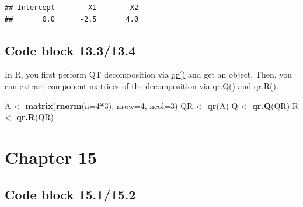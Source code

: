 \documentclass[
]{book}
\newenvironment{Shaded}{\begin{snugshade}}{\end{snugshade}}
\newcommand{\DataTypeTok}[1]{\textcolor[rgb]{0.13,0.29,0.53}{#1}}
\newcommand{\DecValTok}[1]{\textcolor[rgb]{0.00,0.00,0.81}{#1}}
\newcommand{\KeywordTok}[1]{\textcolor[rgb]{0.13,0.29,0.53}{\textbf{#1}}}
\newcommand{\NormalTok}[1]{#1}
\newcommand{\OperatorTok}[1]{\textcolor[rgb]{0.81,0.36,0.00}{\textbf{#1}}}
\newcommand{\OtherTok}[1]{\textcolor[rgb]{0.56,0.35,0.01}{#1}}
\newcommand{\StringTok}[1]{\textcolor[rgb]{0.31,0.60,0.02}{#1}}
\begin{document}
\begin{verbatim}
## Intercept        X1        X2 
##       0.0      -2.5       4.0
\end{verbatim}

\hypertarget{code-block-13.313.4}{%
\subsection*{Code block 13.3/13.4}\label{code-block-13.313.4}}

In R, you first perform QT decomposition via \href{https://stat.ethz.ch/R-manual/R-devel/library/base/html/qr.html}{qr()} and get an object. Then, you can extract component matrices of the decomposition via \href{https://stat.ethz.ch/R-manual/R-devel/library/base/html/qraux.html}{qr.Q()} and \href{https://stat.ethz.ch/R-manual/R-devel/library/base/html/qraux.html}{qr.R()}.

\begin{Shaded}
\begin{Highlighting}[]
\NormalTok{A \textless{}{-}}\StringTok{ }\KeywordTok{matrix}\NormalTok{(}\KeywordTok{rnorm}\NormalTok{(}\DataTypeTok{n=}\DecValTok{4}\OperatorTok{*}\DecValTok{3}\NormalTok{), }\DataTypeTok{nrow=}\DecValTok{4}\NormalTok{, }\DataTypeTok{ncol=}\DecValTok{3}\NormalTok{)}
\NormalTok{QR \textless{}{-}}\StringTok{ }\KeywordTok{qr}\NormalTok{(A)}
\NormalTok{Q \textless{}{-}}\StringTok{ }\KeywordTok{qr.Q}\NormalTok{(QR)}
\NormalTok{R \textless{}{-}}\StringTok{ }\KeywordTok{qr.R}\NormalTok{(QR)}
\end{Highlighting}
\end{Shaded}

\hypertarget{chapter-15}{%
\section*{Chapter 15}\label{chapter-15}}

\hypertarget{code-block-15.115.2}{%
\subsection*{Code block 15.1/15.2}\label{code-block-15.115.2}}

\begin{Shaded}
\end{Shaded}
\end{document}
